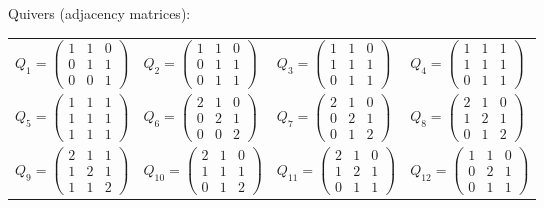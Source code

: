 \documentclass{article}
\begin{document}
\noindent Quivers (adjacency matrices):\\[4pt]
\renewcommand{\arraystretch}{1.6}
\begin{tabular}{llll}
$Q_{1}=\left(\begin{smallmatrix}1&1&0\\0&1&1\\0&0&1\end{smallmatrix}\right)$ & $Q_{2}=\left(\begin{smallmatrix}1&1&0\\0&1&1\\0&1&1\end{smallmatrix}\right)$ & $Q_{3}=\left(\begin{smallmatrix}1&1&0\\1&1&1\\0&1&1\end{smallmatrix}\right)$ & $Q_{4}=\left(\begin{smallmatrix}1&1&1\\1&1&1\\0&1&1\end{smallmatrix}\right)$ \\[4pt]
$Q_{5}=\left(\begin{smallmatrix}1&1&1\\1&1&1\\1&1&1\end{smallmatrix}\right)$ & $Q_{6}=\left(\begin{smallmatrix}2&1&0\\0&2&1\\0&0&2\end{smallmatrix}\right)$ & $Q_{7}=\left(\begin{smallmatrix}2&1&0\\0&2&1\\0&1&2\end{smallmatrix}\right)$ & $Q_{8}=\left(\begin{smallmatrix}2&1&0\\1&2&1\\0&1&2\end{smallmatrix}\right)$ \\[4pt]
$Q_{9}=\left(\begin{smallmatrix}2&1&1\\1&2&1\\1&1&2\end{smallmatrix}\right)$ & $Q_{10}=\left(\begin{smallmatrix}2&1&0\\1&1&1\\0&1&2\end{smallmatrix}\right)$ & $Q_{11}=\left(\begin{smallmatrix}2&1&0\\1&2&1\\0&1&1\end{smallmatrix}\right)$ & $Q_{12}=\left(\begin{smallmatrix}1&1&0\\0&2&1\\0&1&1\end{smallmatrix}\right)$ \\[4pt]

\end{tabular}
\end{document}
